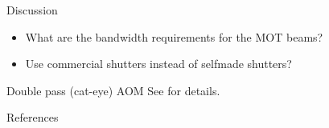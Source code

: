 \documentclass[aspectratio=169]{beamer}
\begin{document}
	\begin{frame}{Discussion}
		\begin{itemize}
			\item What are the bandwidth requirements for the MOT beams?
			\item Use commercial shutters instead of selfmade shutters?
		\end{itemize}
	\end{frame}
	
	\appendix
	
	\begin{frame}{Double pass (cat-eye) AOM}
		See \cite{Donley2005} for details.
	\end{frame}

	\begin{frame}[allowframebreaks]{References}
		\printbibliography
	\end{frame}
\end{document}
